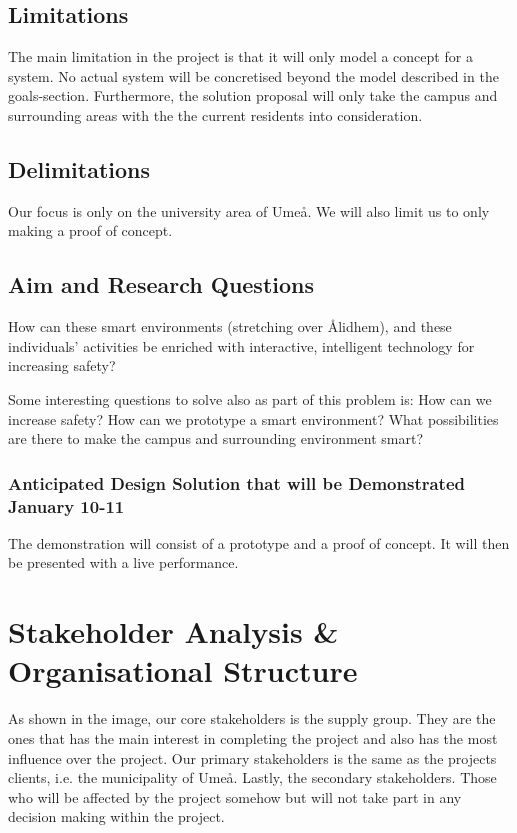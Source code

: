 \documentclass[twoside]{report}
\begin{document}
\subsection{Limitations} The main limitation in the project is that it will
only model a concept for a system. No actual system will be concretised beyond
the model described in the goals-section. Furthermore, the solution proposal
will only take the campus and surrounding areas with the the current residents
into consideration.

\subsection{Delimitations}
Our focus is only on the university area of Umeå. We will also limit us to only making a proof of concept.

\subsection{Aim and Research Questions}

How can these smart environments (stretching over Ålidhem), and these
individuals’ activities be enriched with interactive, intelligent technology
for increasing safety? 

Some interesting questions to solve also as part of this
problem is: How can we increase safety? How can we prototype a smart
environment? What possibilities are there to make the campus and surrounding
environment smart? 

\subsubsection{Anticipated Design Solution that will be Demonstrated January 10-11}

The demonstration will consist of a prototype and a proof of concept. It will then be presented with a live performance.  

\section{Stakeholder Analysis \& Organisational Structure}
\begin{rightsiderules}
As shown in the image, our core stakeholders is the supply
group. They are the ones that has the main interest in completing the project
and also has the most influence over the project. Our primary stakeholders is
the same as the projects clients, i.e. the municipality of Umeå.
Lastly, the secondary stakeholders. Those who will be affected by the project
somehow but will not take part in any decision making within the project.
\end{rightsiderules}
\end{document}
